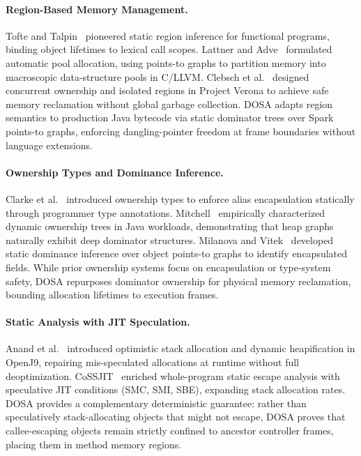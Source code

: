 \documentclass[12pt,a4paper]{article}
\begin{document}
\paragraph{Region-Based Memory Management.}
Tofte and Talpin~\cite{tofte1997region} pioneered static region inference for functional programs, binding object lifetimes to lexical call scopes. Lattner and Adve~\cite{lattner2005automatic} formulated automatic pool allocation, using points-to graphs to partition memory into macroscopic data-structure pools in C/LLVM. Clebsch et al.~\cite{verona2019} designed concurrent ownership and isolated regions in Project Verona to achieve safe memory reclamation without global garbage collection. DOSA adapts region semantics to production Java bytecode via static dominator trees over Spark points-to graphs, enforcing dangling-pointer freedom at frame boundaries without language extensions.

\paragraph{Ownership Types and Dominance Inference.}
Clarke et al.~\cite{clarke1998ownership} introduced ownership types to enforce alias encapsulation statically through programmer type annotations. Mitchell~\cite{mitchell2006ownership} empirically characterized dynamic ownership trees in Java workloads, demonstrating that heap graphs naturally exhibit deep dominator structures. Milanova and Vitek~\cite{milanova2011ownership} developed static dominance inference over object points-to graphs to identify encapsulated fields. While prior ownership systems focus on encapsulation or type-system safety, DOSA repurposes dominator ownership for physical memory reclamation, bounding allocation lifetimes to execution frames.

\paragraph{Static Analysis with JIT Speculation.}
Anand et al.~\cite{anand2024heapify} introduced optimistic stack allocation and dynamic heapification in OpenJ9, repairing mis-speculated allocations at runtime without full deoptimization. CoSSJIT~\cite{cossjit2025} enriched whole-program static escape analysis with speculative JIT conditions (SMC, SMI, SBE), expanding stack allocation rates. DOSA provides a complementary deterministic guarantee: rather than speculatively stack-allocating objects that might not escape, DOSA proves that callee-escaping objects remain strictly confined to ancestor controller frames, placing them in method memory regions.
\end{document}
